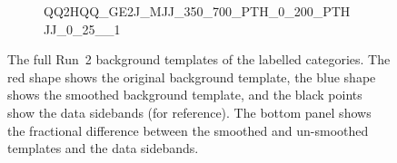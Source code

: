 \begin{figure}
\begin{center}
\begin{subfigure}[T]{0.49\linewidth}
	\caption{\tiny{QQ2HQQ\_GE2J\_MJJ\_350\_700\_PTH\_0\_200\_PTHJJ\_0\_25\_\_1}}
\end{subfigure}
\caption{The full Run~2 background templates of the labelled categories. The red shape shows the original background template, the blue shape shows the smoothed background template, and the black points show the data sidebands (for reference). The bottom panel shows the fractional difference between the smoothed and un-smoothed templates and the data sidebands. }
 \label{fig:gpr_coupcat_13}
 \end{center}
\end{figure}

